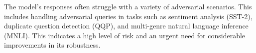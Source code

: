 The model's responses often struggle with a variety of adversarial scenarios. This includes handling adversarial queries in tasks such as sentiment analysis (SST-2), duplicate question detection (QQP), and multi-genre natural language inference (MNLI). This indicates a high level of risk and an urgent need for considerable improvements in its robustness.